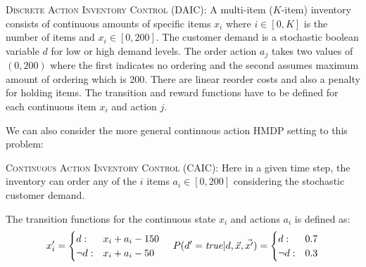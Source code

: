 \documentclass[twoside,11pt]{article}
\newcommand{\InventoryControl}{\textsc{Inventory Control }}
\begin{document}
\textsc{Discrete Action} \InventoryControl (\textsc{DAIC}): 
A multi-item ($K$-item) inventory consists of continuous amounts of specific items $x_i$ where $i \in [0,K]$ is the number of items and $x_i \in [0,200]$. The customer demand is a stochastic boolean variable $d$ for low or high demand levels.  The order action $a_j$ takes two values of $(0,200)$ where the first indicates no ordering and the second assumes maximum amount of ordering which is 200. There are linear reorder costs and also a penalty for holding items. The transition and reward functions have to be defined for each continuous item $x_i$ and action $j$.

We can also consider the more general  continuous action HMDP setting to this problem: 
\vspace{2mm}

\textsc{Continuous Action}  \InventoryControl (\textsc{CAIC}):
Here in a given time step, the inventory can order  any of the $i$ items $a_i \in [0,200]$ considering the stochastic customer demand. 

The transition functions for the continuous state $x_i$ and actions $a_i$ is defined as: 
{%
\vspace{-2mm}
\begin{align}
x'_i= \begin{cases}
d  : & x_i + a_i - 150 \\
\neg d : & x_i + a_i - 50    
\end{cases} %
\hspace{4mm}
 P(d'=\mathit{true}|d,\vec{x},\vec{x'})=  \begin{cases}
d     :& 0.7\\
\neg d : & 0.3	\\
\end{cases} \label{eq:transD_inv}
\end{align}
\vspace{-2mm}}
\end{document}
